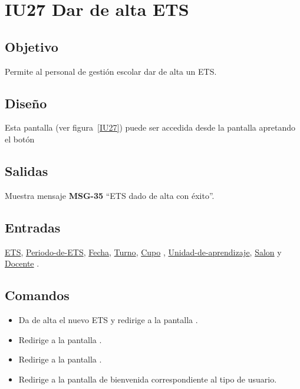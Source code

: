 
\section{IU27 Dar de alta ETS}
\subsection{Objetivo}
    Permite al personal de gestión escolar dar de alta un ETS.
\subsection{Diseño}
    Esta pantalla  (ver figura~\ref{IU27}) puede ser accedida desde la pantalla  apretando el botón 

\subsection{Salidas}
Muestra mensaje {\bf MSG-35} ``ETS  dado de alta con éxito''.
\subsection{Entradas}
\hyperlink{ETS.ETS }{ETS},  \hyperlink{ETS.Periodo-de-ETS }{ Periodo-de-ETS},  \hyperlink{ETS.Fecha}{Fecha},  \hyperlink{ETS.Turno}{Turno},  \hyperlink{ETS.Cupo} {Cupo} ,  \hyperlink{ETS.Unidad-de-aprendizaje }{Unidad-de-aprendizaje},  \hyperlink{ETS.Salon}{Salon} y \hyperlink{ETS.Docente}{Docente} .
\subsection{Comandos}
\begin{itemize}
    \item {} Da de alta el nuevo ETS y redirige a la pantalla .
    \item {} Redirige a la pantalla .
    \item {} Redirige a la pantalla .
    \item {} Redirige a la pantalla de bienvenida correspondiente al tipo de usuario.
    
\end{itemize}


